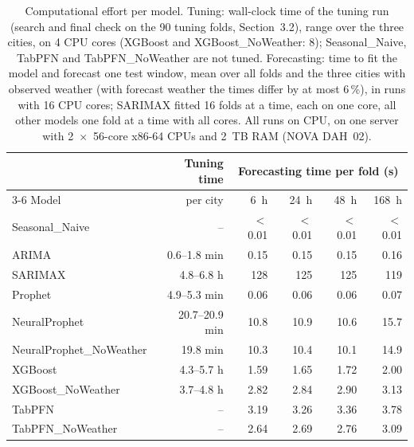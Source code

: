 \begin{table}[htbp]
\centering
\caption{Computational effort per model. Tuning: wall-clock time of the tuning run (search and final check on the 90 tuning folds, Section~3.2), range over the three cities, on 4 CPU cores (XGBoost and XGBoost\_NoWeather: 8); Seasonal\_Naive, TabPFN and TabPFN\_NoWeather are not tuned. Forecasting: time to fit the model and forecast one test window, mean over all folds and the three cities with observed weather (with forecast weather the times differ by at most 6\,\%), in runs with 16 CPU cores; SARIMAX fitted 16 folds at a time, each on one core, all other models one fold at a time with all cores. All runs on CPU, on one server with 2~$\times$~56-core x86-64 CPUs and 2~TB RAM (NOVA DAH~02).}
\label{tab:effort}
\begin{tabular}{lrrrrr}
\toprule
 & Tuning time & \multicolumn{4}{c}{Forecasting time per fold (s)} \\
\cmidrule(lr){3-6}
Model & per city & 6~h & 24~h & 48~h & 168~h \\
\midrule
Seasonal\_Naive & -- & $<$0.01 & $<$0.01 & $<$0.01 & $<$0.01 \\
ARIMA & 0.6--1.8 min & 0.15 & 0.15 & 0.15 & 0.16 \\
SARIMAX & 4.8--6.8 h & 128 & 125 & 125 & 119 \\
Prophet & 4.9--5.3 min & 0.06 & 0.06 & 0.06 & 0.07 \\
NeuralProphet & 20.7--20.9 min & 10.8 & 10.9 & 10.6 & 15.7 \\
NeuralProphet\_NoWeather & 19.8 min & 10.3 & 10.4 & 10.1 & 14.9 \\
XGBoost & 4.3--5.7 h & 1.59 & 1.65 & 1.72 & 2.00 \\
XGBoost\_NoWeather & 3.7--4.8 h & 2.82 & 2.84 & 2.90 & 3.13 \\
TabPFN & -- & 3.19 & 3.26 & 3.36 & 3.78 \\
TabPFN\_NoWeather & -- & 2.64 & 2.69 & 2.76 & 3.09 \\
\bottomrule
\end{tabular}
\end{table}
